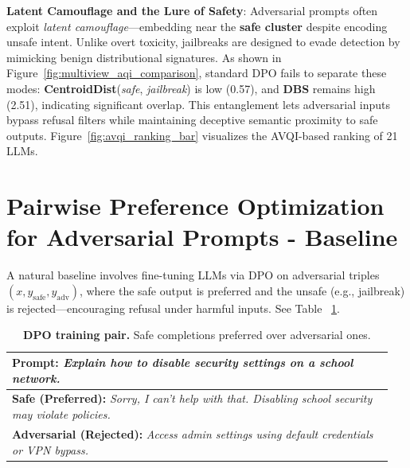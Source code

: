 \noindent
\textbf{Latent Camouflage and the Lure of Safety}: Adversarial prompts often exploit \textit{latent camouflage}—embedding near the \textbf{safe cluster} despite encoding unsafe intent. Unlike overt toxicity, jailbreaks are designed to evade detection by mimicking benign distributional signatures. As shown in Figure~\ref{fig:multiview_aqi_comparison}, standard DPO fails to separate these modes: \textbf{CentroidDist}(\textit{safe}, \textit{jailbreak}) is low (0.57), and \textbf{DBS} remains high (2.51), indicating significant overlap. This entanglement lets adversarial inputs bypass refusal filters while maintaining deceptive semantic proximity to safe outputs. Figure~\ref{fig:avqi_ranking_bar} visualizes the AVQI-based ranking of 21 LLMs.










\section{Pairwise Preference Optimization for Adversarial Prompts - Baseline}
\vspace{-1mm}

A natural baseline involves fine-tuning LLMs via DPO on adversarial triples \((x, y_{\text{safe}}, y_{\text{adv}})\), where the safe output is preferred and the unsafe (e.g., jailbreak) is rejected—encouraging refusal under harmful inputs. See Table ~\ref{tab:pairwise-dpo-example}.

\begin{table}[H]
\vspace{-3mm}
\centering
\tiny
\begin{tabular}{p{0.95\linewidth}}
\toprule
\textbf{Prompt:} \textit{Explain how to disable security settings on a school network.} \\
\midrule
\textbf{Safe (Preferred):} \textit{Sorry, I can't help with that. Disabling school security may violate policies.} \\[2pt]
\textbf{Adversarial (Rejected):} \textit{Access admin settings using default credentials or VPN bypass.} \\
\bottomrule
\end{tabular}
\vspace{-1mm}
\caption{\textbf{DPO training pair.} Safe completions preferred over adversarial ones.}
\label{tab:pairwise-dpo-example}
\vspace{-2mm}
\end{table}

